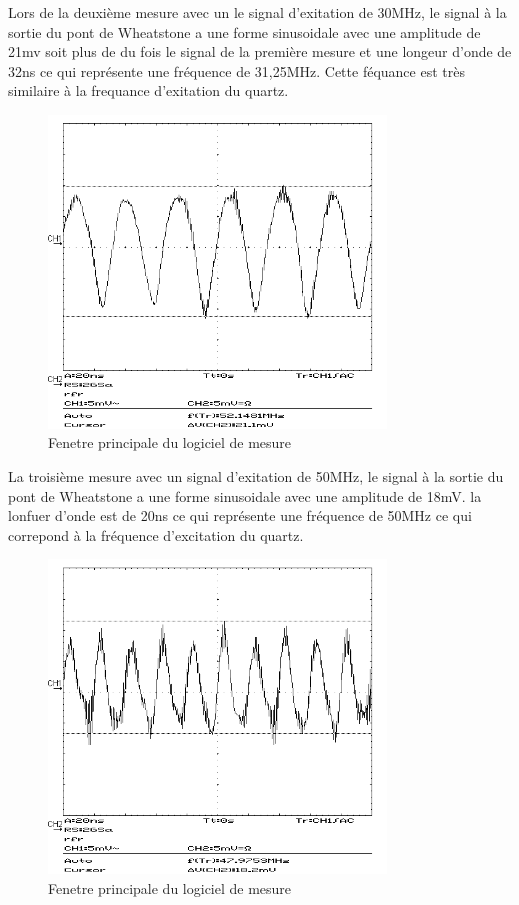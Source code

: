 Lors de la deuxième mesure avec un le signal d'exitation de 30MHz, le signal à la sortie du pont de Wheatstone a une forme sinusoidale avec une amplitude de 21mv soit plus de du fois le signal de la première mesure et une longeur d'onde de 32ns ce qui représente une fréquence de 31,25MHz.
Cette féquance est très similaire à la frequance d'exitation du quartz. 
\begin{figure}[H]
    \centering
    \includegraphics[width=0.8\textwidth]{assets/figures/SCR00007.png}
    \caption{Fenetre principale du logiciel de mesure}
    \label{fig:30mhzbruit}
\end{figure}

La troisième mesure avec un signal d'exitation de 50MHz, le signal à la sortie du pont de Wheatstone a une forme sinusoidale avec une amplitude de 18mV.
la lonfuer d'onde est de 20ns ce qui représente une fréquence de 50MHz ce qui correpond à la fréquence d'excitation du quartz.
\begin{figure}[H]
    \centering
    \includegraphics[width=0.8\textwidth]{assets/figures/SCR00008.png}
    \caption{Fenetre principale du logiciel de mesure}
    \label{fig:50mhzbruit}
\end{figure}

